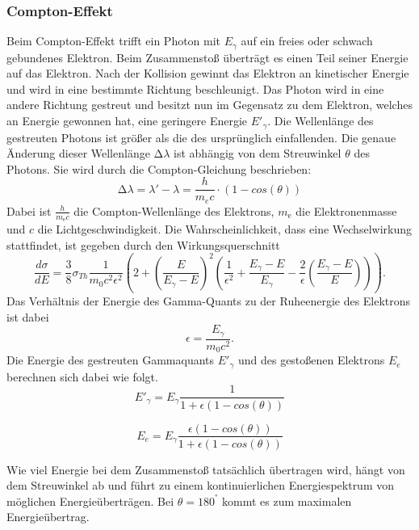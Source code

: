 \subsubsection{Compton-Effekt}
Beim Compton-Effekt trifft ein Photon mit $E_{\gamma}$ auf ein freies oder schwach gebundenes Elektron. Beim Zusammenstoß überträgt es einen Teil seiner Energie auf das 
Elektron. Nach der Kollision gewinnt das Elektron an kinetischer Energie und wird in eine bestimmte Richtung beschleunigt. Das Photon wird in eine andere Richtung gestreut 
und besitzt nun im Gegensatz zu dem Elektron, welches an Energie gewonnen hat, eine geringere Energie $E'_{\gamma}$. Die Wellenlänge des 
gestreuten Photons ist größer als die des ursprünglich einfallenden. Die genaue Änderung dieser Wellenlänge $\increment\lambda$ ist abhängig von dem Streuwinkel $\theta$ des
Photons. Sie wird durch die Compton-Gleichung beschrieben:
\begin{equation}
    \increment\lambda= \lambda'-\lambda=\frac{h}{m_ec}\cdot(1-cos(\theta)) 
\end{equation}
Dabei ist $\frac{h}{m_\text{e}c}$ die Compton-Wellenlänge des Elektrons, \(m_\text{e}\) die Elektronenmasse und \(c\) die Lichtgeschwindigkeit.
Die Wahrscheinlichkeit, dass eine Wechselwirkung stattfindet, ist gegeben durch den Wirkungsquerschnitt
\begin{equation}
    \frac{d\sigma}{dE} = \frac{3}{8}\sigma_{Th}\frac{1}{m_0c^2\epsilon^2}\left(2 + \left(\frac{E}{E_{\gamma}-E}\right)^2 \left(\frac{1}{\epsilon^2} + \frac{E_{\gamma}-E}{E_{\gamma}} - \frac{2}{\epsilon}\left(\frac{E_{\gamma}-E}{E}\right)\right)\right).
    \label{eq:querschnitt}
\end{equation}
Das Verhältnis der Energie des Gamma-Quants zu der Ruheenergie des Elektrons ist dabei
\begin{equation}
    \epsilon=\frac{E_{\gamma}}{m_0c^2}.
\end{equation}    
Die Energie des gestreuten Gammaquants $E'_{\gamma}$ und des gestoßenen Elektrons $E_e$ berechnen sich dabei wie folgt.
\begin{equation}
    E'_{\gamma}=E_{\gamma}\frac{1}{1+\epsilon(1-cos(\theta))}
    \label{eq:estrich}
\end{equation}

\begin{equation}
    E_e=E_{\gamma}\frac{\epsilon(1-cos(\theta))}{1+\epsilon(1-cos(\theta))}
    \label{eq:energie_e}
\end{equation}

Wie viel Energie bei dem Zusammenstoß tatsächlich übertragen wird, hängt von dem Streuwinkel ab und führt zu einem kontinuierlichen
Energiespektrum von möglichen Energieüberträgen. Bei $\theta= 180^°$ kommt es zum maximalen Energieübertrag.
\cite{Compton}


